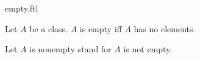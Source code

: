 \documentclass{article}
\begin{document}
\begin{smodule}[creators={Marcel Schütz}]{empty.ftl}

  \begin{fdefinition*}[label=6252477624090624]
    Let $A$ be a class.
    $A$ is empty iff $A$ has no elements.

    Let $A$ is nonempty stand for $A$ is not empty.
  \end{fdefinition*}
\end{smodule}
\end{document}
